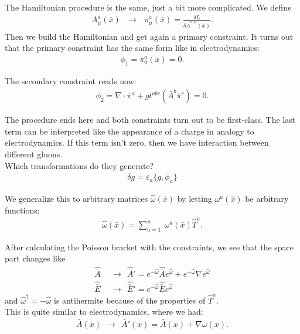 \pagebreak

The Hamiltonian procedure is the same, just a bit more complicated. We define
\begin{align}
A_{\mu}^a(\bar{x}) \ \ \ \longrightarrow \ \ \ \pi_{\mu}^a(\bar{x}) = \frac{\delta L}{\delta \dot{A}^{a, \mu}(\bar{x})}.
\end{align}
Then we build the Hamiltonian and get again a primary constraint.
It turns out that the primary constraint has the same form like in electrodynamics:
\begin{align}
\phi_1 = \pi_0^a(\bar{x}) = 0.
\end{align}

The secondary constraint reads now:
\begin{align}
\phi_2 = \nabla \cdot \bar{\pi}^a + g t^{abc} \left( \bar{A}^b \bar{\pi}^c \right) = 0.
\end{align}

The procedure ends here and both constraints turn out to be first-class.
The last term can be interpreted like the appearance of a charge in analogy to electrodynamics. If this term isn't zero, then we have interaction between different gluons. \\


Which transformations do they generate? 
\begin{align}
\delta g = \varepsilon_a \{ g,\phi_a \}
\end{align}

We generalize this to arbitrary matrices $\hat{\omega}(\bar{x})$ by letting $\omega^a(\bar{x})$ be arbitrary functions:
\begin{align}
\hat{\omega}(\bar{x}) = \sum_{a=1}^n \ \omega^a(\bar{x}) \hat{T}^a.
\end{align}

After calculating the Poisson bracket with the constraints, we see that the space part changes like
\begin{align}
\hat{\bar{A}} \ \ &\longrightarrow \ \ \hat{\bar{A}}' = e^{- \hat{\omega}} \hat{\bar{A}} e^{\hat{\omega}} + e^{- \hat{\omega}} \nabla e^{\hat{\omega}} \\
\hat{\bar{E}} \ \ &\longrightarrow \ \ \hat{\bar{E}}' = e^{- \hat{\omega}} \hat{\bar{E}} e^{\hat{\omega}} 
\end{align}
and $\hat{\omega}^\dag = - \hat{\omega}$ is antihermite because of the properties of $\hat{T}^a$. \\
This is quite similar to electrodynamics, where we had:
\begin{align}
\bar{A}(\bar{x}) \ \ \longrightarrow \ \ \bar{A}'(\bar{x}) = \bar{A}(\bar{x}) + \nabla \omega(\bar{x}) .
\end{align}

